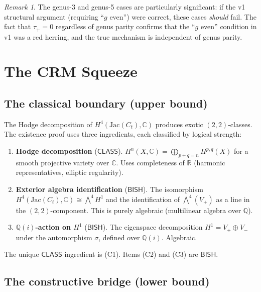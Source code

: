 \documentclass[11pt]{article}
\theoremstyle{plain}
\theoremstyle{definition}
\theoremstyle{remark}
\newtheorem{remark}[theorem]{Remark}
\newcommand{\Q}{\mathbb{Q}}
\newcommand{\R}{\mathbb{R}}
\newcommand{\C}{\mathbb{C}}
\newcommand{\BISH}{\ensuremath{\mathsf{BISH}}}
\newcommand{\CLASS}{\ensuremath{\mathsf{CLASS}}}
\begin{document}
\begin{remark}
The genus-3 and genus-5 cases are particularly significant: if
the v1 structural argument (requiring ``$g$ even'') were correct,
these cases \emph{should} fail.  The fact that $\tau_+ = 0$
regardless of genus parity confirms that the ``$g$ even'' condition
in v1 was a red herring, and the true mechanism is independent
of genus parity.
\end{remark}

\section{The CRM Squeeze}\label{sec:squeeze}

\subsection{The classical boundary (upper bound)}

The Hodge decomposition of $H^4(\mathrm{Jac}(C_t), \C)$ produces
exotic $(2,2)$-classes.  The existence proof uses three ingredients,
each classified by logical strength:

\begin{enumerate}[nosep,label=(C\arabic*)]
\item \textbf{Hodge decomposition} ($\CLASS$).
  $H^n(X, \C) = \bigoplus_{p+q=n} H^{p,q}(X)$ for a smooth
  projective variety over $\C$.  Uses completeness of $\R$
  (harmonic representatives, elliptic regularity).
\item \textbf{Exterior algebra identification} ($\BISH$).
  The isomorphism $H^4(\mathrm{Jac}(C_t), \C) \cong \bigwedge^4 H^1$
  and the identification of $\bigwedge^4(V_+)$ as a line in the
  $(2,2)$-component.  This is purely algebraic (multilinear algebra
  over $\Q$).
\item \textbf{$\Q(i)$-action on $H^1$} ($\BISH$).
  The eigenspace decomposition $H^1 = V_+ \oplus V_-$ under
  the automorphism $\sigma$, defined over $\Q(i)$.  Algebraic.
\end{enumerate}

The unique $\CLASS$ ingredient is (C1).  Items (C2) and (C3) are $\BISH$.

\subsection{The constructive bridge (lower bound)}
\end{document}
